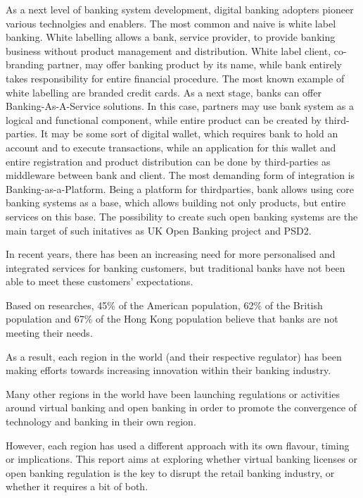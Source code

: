 As a next level of banking system development, digital banking adopters pioneer various technolgies and enablers. 
The most common and naive is white label banking. 
White labelling allows a bank, service provider, to provide banking business without product management and distribution. White label client, co-branding partner, may offer banking product by its name, while bank entirely takes responsibility for entire financial procedure.
The most known example of white labelling are branded credit cards.
As a next stage, banks can offer Banking-As-A-Service solutions. 
In this case, partners may use bank system as a logical and functional component, while entire product can be created by third-parties. It may be some sort of digital wallet, which requires bank to hold an account and to execute transactions, while an application for this wallet and entire registration and product distribution can be done by third-parties as middleware between bank and client.
The most demanding form of integration is Banking-as-a-Platform. Being a platform for thirdparties, bank allows using core banking systems as a base, which allows building not only products, but entire services on this base. 
The possibility to create such open banking systems are the main target of such initatives as UK Open Banking project and PSD2.
\cite{what_is_digital_banking}

In recent years, there has been an increasing need for more personalised and integrated services for banking customers, but traditional banks have not been able to meet these customers’ expectations.

Based on researches, 45\% of the American population, 62\% of the British population and 67\% of the Hong Kong population believe that banks are not meeting their needs.
\cite{wavestone_virtual_banking}

As a result, each region in the world (and their respective regulator) has been making efforts towards increasing innovation within their banking industry.

Many other regions in the world have been launching regulations or activities around virtual banking and open banking in order to promote the convergence of technology and banking in their own region.

However, each region has used a different approach with its own flavour, timing or implications.
This report aims at exploring whether virtual banking licenses 
or open banking regulation is the key to disrupt the retail banking industry, 
or whether it requires a bit of both. 

